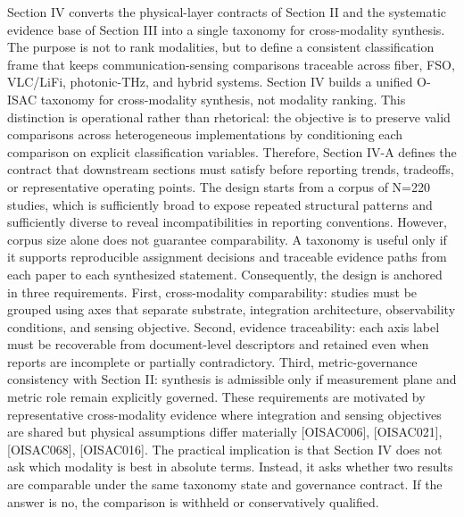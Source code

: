 {}
\markdownRendererSectionEnd 
\markdownRendererSectionEnd \markdownRendererSectionBegin
{}\markdownRendererInterblockSeparator
{}Section IV converts the physical-layer contracts of Section II and the systematic evidence base of Section III into a single taxonomy for cross-modality synthesis. The purpose is not to rank modalities, but to define a consistent classification frame that keeps communication-sensing comparisons traceable across fiber, FSO, VLC/LiFi, photonic-THz, and hybrid systems.\markdownRendererInterblockSeparator
{}\markdownRendererSectionBegin
{}\markdownRendererInterblockSeparator
{}\markdownRendererSectionBegin
{}\markdownRendererInterblockSeparator
{}Section IV builds a unified O-ISAC taxonomy for cross-modality synthesis, not modality ranking. This distinction is operational rather than rhetorical: the objective is to preserve valid comparisons across heterogeneous implementations by conditioning each comparison on explicit classification variables. Therefore, Section IV-A defines the contract that downstream sections must satisfy before reporting trends, tradeoffs, or representative operating points.\markdownRendererParagraphSeparator
{}The design starts from a corpus of N=220 studies, which is sufficiently broad to expose repeated structural patterns and sufficiently diverse to reveal incompatibilities in reporting conventions. However, corpus size alone does not guarantee comparability. A taxonomy is useful only if it supports reproducible assignment decisions and traceable evidence paths from each paper to each synthesized statement. Consequently, the design is anchored in three requirements. First, cross-modality comparability: studies must be grouped using axes that separate substrate, integration architecture, observability conditions, and sensing objective. Second, evidence traceability: each axis label must be recoverable from document-level descriptors and retained even when reports are incomplete or partially contradictory. Third, metric-governance consistency with Section II: synthesis is admissible only if measurement plane and metric role remain explicitly governed.\markdownRendererParagraphSeparator
{}These requirements are motivated by representative cross-modality evidence where integration and sensing objectives are shared but physical assumptions differ materially [O\markdownRendererUnderscore{}ISAC\markdownRendererUnderscore{}006], [O\markdownRendererUnderscore{}ISAC\markdownRendererUnderscore{}021], [O\markdownRendererUnderscore{}ISAC\markdownRendererUnderscore{}068], [O\markdownRendererUnderscore{}ISAC\markdownRendererUnderscore{}016]. The practical implication is that Section IV does not ask which modality is best in absolute terms. Instead, it asks whether two results are comparable under the same taxonomy state and governance contract. If the answer is no, the comparison is withheld or conservatively qualified.\markdownRendererInterblockSeparator
